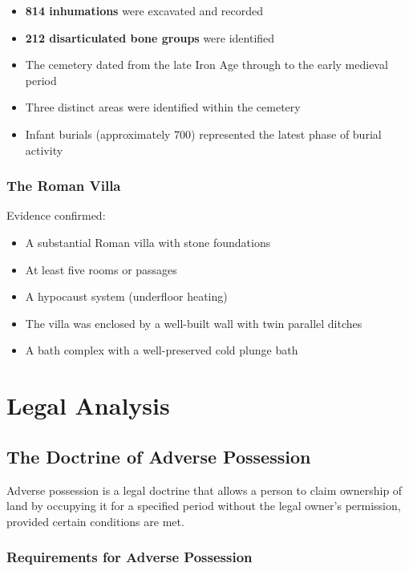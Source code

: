 \documentclass[11pt,a4paper]{article}
\begin{document}
\begin{itemize}
    \item \textbf{814 inhumations} were excavated and recorded
    \item \textbf{212 disarticulated bone groups} were identified
    \item The cemetery dated from the late Iron Age through to the early medieval period
    \item Three distinct areas were identified within the cemetery
    \item Infant burials (approximately 700) represented the latest phase of burial activity
\end{itemize}

\subsubsection{The Roman Villa}

Evidence confirmed:
\begin{itemize}
    \item A substantial Roman villa with stone foundations
    \item At least five rooms or passages
    \item A hypocaust system (underfloor heating)
    \item The villa was enclosed by a well-built wall with twin parallel ditches
    \item A bath complex with a well-preserved cold plunge bath
\end{itemize}

\newpage

\section{Legal Analysis}

\subsection{The Doctrine of Adverse Possession}

Adverse possession is a legal doctrine that allows a person to claim ownership of land by occupying it for a specified period without the legal owner's permission, provided certain conditions are met.

\subsubsection{Requirements for Adverse Possession}
\end{document}
